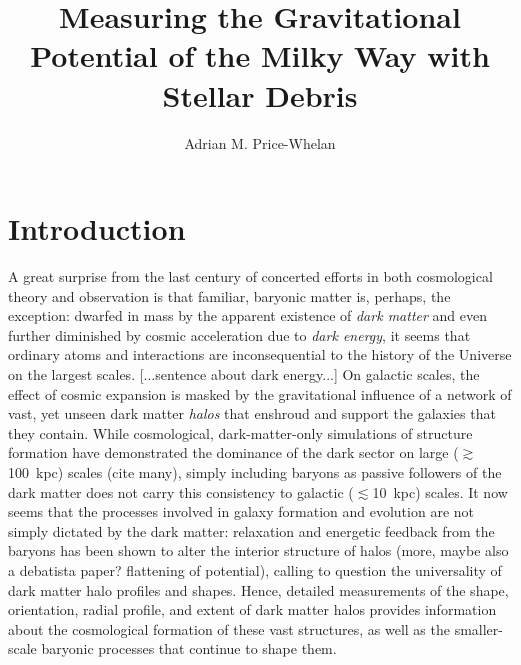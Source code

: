 \documentclass[letterpaper,12pt,preprint]{aastex}
\begin{document}
\title{Measuring the Gravitational Potential of the Milky Way with Stellar Debris}
\author{Adrian M. Price-Whelan}

\section{Introduction}

A great surprise from the last century of concerted efforts in both cosmological theory and observation is that familiar, baryonic matter is, perhaps, the exception: dwarfed in mass by the apparent existence of \emph{dark matter} and even further diminished by cosmic acceleration due to \emph{dark energy}, it seems that ordinary atoms and interactions are inconsequential to the history of the Universe on the largest scales. [...sentence about dark energy...] On galactic scales, the effect of cosmic expansion is masked by the gravitational influence of a network of vast, yet unseen dark matter \emph{halos} that enshroud and support the galaxies that they contain. While cosmological, dark-matter-only simulations of structure formation have demonstrated  the dominance of the dark sector on large ($\gtrsim$100~kpc) scales (cite many), simply including baryons as passive followers of the dark matter does not carry this consistency to galactic ($\lesssim$10~kpc) scales. It now seems that the processes involved in galaxy formation and evolution are not simply dictated by the dark matter: relaxation and energetic feedback from the baryons has been shown to alter the interior structure of halos \citep[e.g.][]{bailin05, pontzen12} (more, maybe also a debatista paper? flattening of potential), calling to question the universality of dark matter halo profiles and shapes. Hence, detailed measurements of the shape, orientation, radial profile, and extent of dark matter halos provides information about the cosmological formation of these vast structures, as well as the smaller-scale baryonic processes that continue to shape them.


\end{document}
